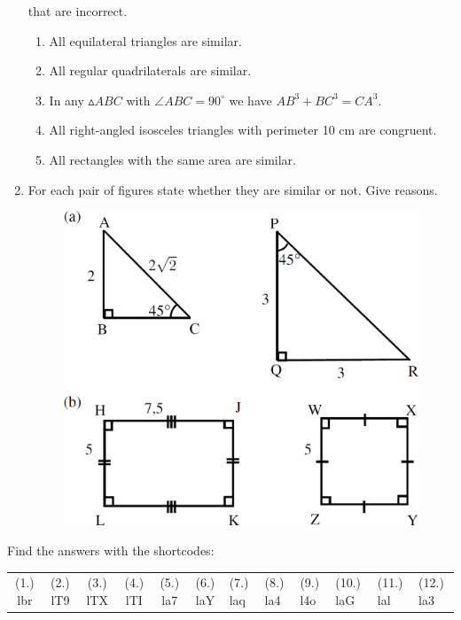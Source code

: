 \begin{enumerate}[noitemsep, label=\textbf{\arabic*}. ]
that are incorrect.
\begin{enumerate}[noitemsep, label=\textbf{\alph*}. ] 
\item All equilateral triangles are similar.
\item All regular quadrilaterals are similar.
\item In any $▵ABC$ with $\angle ABC={90}^{\circ }$ we have
$A{B}^{3}+B{C}^{3}=C{A}^{3}$.
\item All right-angled isosceles triangles with perimeter 10 cm are congruent.
\item All rectangles with the same area are similar.
\end{enumerate}
\item For each pair of figures state whether they are similar or not. Give
reasons.
\setcounter{subfigure}{0}
\begin{figure}[H] %
\begin{center}
\label{m39358*id320590!!!underscore!!!media}\label{
m39358*id320590!!!underscore!!!printimage}\includegraphics[width=.8\columnwidth]
{col11306.imgs/m39358_MG10C13_053.png} %
\vspace{2pt}
\vspace{.1in}
\end{center}
\end{figure}               \end{enumerate}

\par {} Find the
answers with the shortcodes:
\par \begin{tabular}[h]{cccccc}
(1.) lbr  &  (2.) lT9  &  (3.) lTX  &  (4.) lTI  &  (5.) la7  &  (6.) laY  & 
(7.) laq  &  (8.) la4  &  (9.) l4o  &  (10.) laG  &  (11.) lal  &  (12.) la3  &
\end{tabular}

